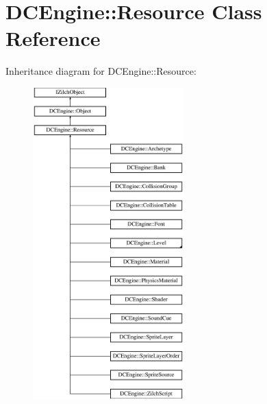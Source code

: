 \hypertarget{classDCEngine_1_1Resource}{\section{D\-C\-Engine\-:\-:Resource Class Reference}
\label{classDCEngine_1_1Resource}
}
Inheritance diagram for D\-C\-Engine\-:\-:Resource\-:\begin{figure}[H]
\begin{center}
\leavevmode
\includegraphics[height=12.000000cm]{classDCEngine_1_1Resource}
\end{center}
\end{figure}
